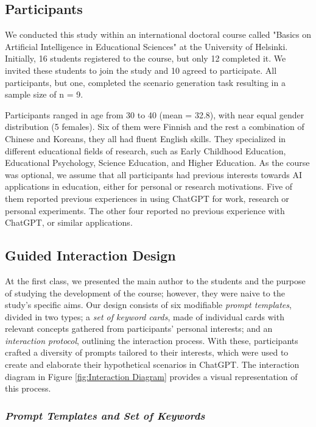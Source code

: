 \documentclass[sn-mathphys, Numbered]{sn-jnl}%
\theoremstyle{thmstyleone}%
\theoremstyle{thmstyletwo}%
\theoremstyle{thmstylethree}%
\begin{document}
\subsection*{Participants}

We conducted this study within an international doctoral course called "Basics on Artificial Intelligence in Educational Sciences" at the University of Helsinki. Initially, 16 students registered to the course, but only 12 completed it. We invited these students to join the study and 10 agreed to participate. All participants, but one, completed the scenario generation task resulting in a sample size of n = 9.

Participants ranged in age from 30 to 40 (mean = 32.8), with near equal gender distribution (5 females). Six of them were Finnish and the rest a combination of Chinese and Koreans, they all had fluent English skills. They specialized in different educational fields of research, such as Early Childhood Education, Educational Psychology, Science Education, and Higher Education. As the course was optional, we assume that all participants had previous interests towards AI applications in education, either for personal or research motivations. Five of them reported previous experiences in using ChatGPT for work, research or personal experiments. The other four reported no previous experience with ChatGPT, or similar applications. 


\subsection*{Guided Interaction Design}\label{Interaction design}

At the first class, we presented the main author to the students and the purpose of studying the development of the course; however, they were naive to the study's specific aims.
Our design consists of six modifiable \textit{prompt templates}, divided in two types; a \textit{set of keyword cards}, made of individual cards with relevant concepts gathered from participants' personal interests; and an \textit{interaction protocol}, outlining the interaction process. With these, participants crafted a diversity of prompts tailored to their interests, which were used to create and elaborate their hypothetical scenarios in ChatGPT. The interaction diagram in Figure \ref{fig:Interaction Diagram} provides a visual representation of this process.

\subsubsection*{\textit{Prompt Templates and Set of Keywords}}
\end{document}
